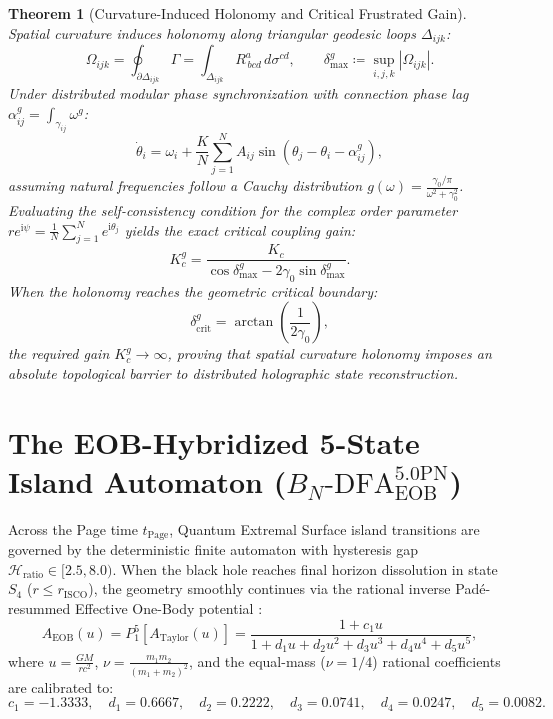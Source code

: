 \documentclass[11pt,a4paper,reqno]{article}
\newtheorem{theorem}{Theorem}[section]
\theoremstyle{definition}
\numberwithin{equation}{section}
\begin{document}
\begin{theorem}[Curvature-Induced Holonomy and Critical Frustrated Gain]
Spatial curvature induces holonomy along triangular geodesic loops $\Delta_{ijk}$:
\begin{equation}
\Omega_{ijk} = \oint_{\partial \Delta_{ijk}} \Gamma = \int_{\Delta_{ijk}} R^a_{\,bcd} \, d\sigma^{cd}, \qquad \delta_{\max}^g \coloneqq \sup_{i, j, k} |\Omega_{ijk}|.
\end{equation}
Under distributed modular phase synchronization with connection phase lag $\alpha_{ij}^g = \int_{\gamma_{ij}} \omega^g$:
\begin{equation}
\dot{\theta}_i = \omega_i + \frac{K}{N} \sum_{j=1}^N A_{ij} \sin\left( \theta_j - \theta_i - \alpha_{ij}^g \right),
\end{equation}
assuming natural frequencies follow a Cauchy distribution $g(\omega) = \frac{\gamma_0 / \pi}{\omega^2 + \gamma_0^2}$. Evaluating the self-consistency condition for the complex order parameter $r e^{\mathrm{i}\psi} = \frac{1}{N} \sum_{j=1}^N e^{\mathrm{i}\theta_j}$ yields the exact critical coupling gain:
\begin{equation}
K_c^g = \frac{K_c}{\cos\delta_{\max}^g - 2\gamma_0 \sin\delta_{\max}^g}.
\label{eq:critical_frustrated_gain}
\end{equation}
When the holonomy reaches the geometric critical boundary:
\begin{equation}
\delta_{\mathrm{crit}}^g = \arctan\left( \frac{1}{2\gamma_0} \right),
\end{equation}
the required gain $K_c^g \to \infty$, proving that spatial curvature holonomy imposes an absolute topological barrier to distributed holographic state reconstruction.
\end{theorem}

\section{The EOB-Hybridized 5-State Island Automaton (\texorpdfstring{$B_N\text{-DFA}_{\mathrm{EOB}}^{5.0\mathrm{PN}}$}{BN-DFA EOB 5.0PN})}
Across the Page time $t_{\mathrm{Page}}$, Quantum Extremal Surface island transitions are governed by the deterministic finite automaton with hysteresis gap $\mathcal{H}_{\mathrm{ratio}} \in [2.5, 8.0)$. When the black hole reaches final horizon dissolution in state $S_4$ ($r \le r_{\mathrm{ISCO}}$), the geometry smoothly continues via the rational inverse Padé-resummed Effective One-Body potential \cite{BuonannoDamour1999,Damour2000}:
\begin{equation}
A_{\mathrm{EOB}}(u) = P_1^5\left[ A_{\mathrm{Taylor}}(u) \right] = \frac{1 + c_1 u}{1 + d_1 u + d_2 u^2 + d_3 u^3 + d_4 u^4 + d_5 u^5},
\label{eq:eob_pade_rational}
\end{equation}
where $u = \frac{G M}{r c^2}$, $\nu = \frac{m_1 m_2}{(m_1 + m_2)^2}$, and the equal-mass ($\nu = 1/4$) rational coefficients are calibrated to:
\begin{equation}
c_1 = -1.3333, \quad d_1 = 0.6667, \quad d_2 = 0.2222, \quad d_3 = 0.0741, \quad d_4 = 0.0247, \quad d_5 = 0.0082.
\label{eq:eob_pade_coefficients_inline}
\end{equation}
\end{document}
